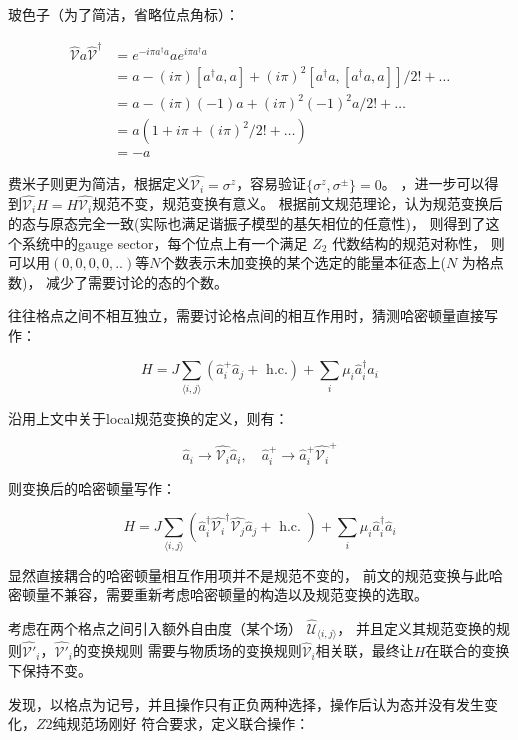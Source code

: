 \documentclass[a4paper]{article}
\begin{document}
玻色子（为了简洁，省略位点角标）：

$$
\begin{aligned}
    \hat{\mathcal{V}} a \hat{\mathcal{V}}^\dagger &= e^{-i\pi a^\dagger a}ae^{i\pi a^\dagger a}
    \\& = a - (i\pi)[a^\dagger a,a] +(i\pi)^2[a^\dagger a,[a^\dagger a,a]]/2! +\dots
    \\&= a -(i\pi)(-1)a + (i\pi)^2(-1)^2a/2! + \dots
    \\&= a (1+i\pi+(i\pi)^2/2!+\dots)
    \\&= -a
\end{aligned}
$$

费米子则更为简洁，根据定义$\hat{\mathcal{V}_i} = \sigma^z$，容易验证$\{\sigma^z,\sigma^\pm\} = 0$。
，进一步可以得到$\hat{\mathcal{V}_i}H = H \hat{\mathcal{V}_i}$规范不变，规范变换有意义。
根据前文规范理论，认为规范变换后的态与原态完全一致(实际也满足谐振子模型的基矢相位的任意性)，
则得到了这个系统中的gauge sector，每个位点上有一个满足 $Z_2$ 代数结构的规范对称性，
则可以用$(0,0,0,0,..)$等$N$个数表示未加变换的某个选定的能量本征态上($N$ 为格点数)，
减少了需要讨论的态的个数。


往往格点之间不相互独立，需要讨论格点间的相互作用时，猜测哈密顿量直接写作：

$$
H=J \sum_{\langle i, j\rangle}\left(\hat{a}_i^{+} 
\hat{a}_j+\text { h.c.}\right)+\sum_i \mu_i \hat{a}_i^{\dagger} \hat{a}_i
$$

沿用上文中关于local规范变换的定义，则有：

$$
\hat{a}_i \rightarrow \hat{\mathcal{V}_i} \hat{a}_i, \quad \hat{a}_i^{+} \rightarrow \hat{a}_i^{+} \hat{\mathcal{V}_i}^{+}
$$

则变换后的哈密顿量写作：

$$
H=J \sum_{\langle i, j\rangle}\left(\hat{a}_i^{\dagger} \hat{\mathcal{V}_i}^{\dagger}\hat{\mathcal{V}_j}\hat{a}_j+\text { h.c. }\right)+\sum_i \mu_i \hat{a}_i^{\dagger} \hat{a}_i
$$

显然直接耦合的哈密顿量相互作用项并不是规范不变的，
前文的规范变换与此哈密顿量不兼容，需要重新考虑哈密顿量的构造以及规范变换的选取。

考虑在两个格点之间引入额外自由度（某个场） $\hat{\mathcal{U}}_{\langle i, j\rangle}$，
并且定义其规范变换的规则$\hat{\mathcal{V}'}_i$，$\hat{\mathcal{V}'}_i$的变换规则
需要与物质场的变换规则$\hat{\mathcal{V}}_i$相关联，最终让$H$在联合的变换下保持不变。

发现，以格点为记号，并且操作只有正负两种选择，操作后认为态并没有发生变化，$Z2$纯规范场刚好
符合要求，定义联合操作：
\end{document}

